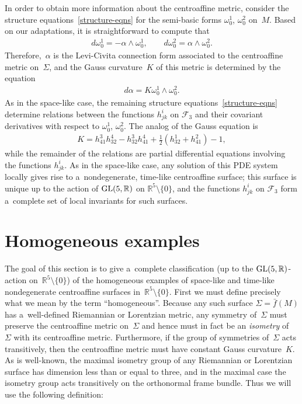 \documentclass[pdftex]{sigma}
\numberwithin{equation}{section}
\theoremstyle{definition}
\begin{document}
In order to obtain more information about the centroaf\/f\/ine metric, consider the structure
equations~\eqref{structure-eqns} for the semi-basic forms $\omega^1_0$, $\omega^2_0$ on~$M$.
Based on our adaptations, it is straightforward to compute that
\begin{gather*}
d\omega^1_0 = -\alpha \wedge \omega^1_0,
\qquad
d\omega^2_0 = \alpha \wedge \omega^2_0.
\end{gather*}
Therefore,~$\alpha$ is the Levi-Civita connection form associated to the centroaf\/f\/ine metric on~$\Sigma$, and the Gauss
curvature~$K$ of this metric is determined by the equation
\begin{gather*}
d\alpha = K  \omega^1_0 \wedge \omega^2_0.
\end{gather*}
As in the space-like case, the remaining structure equations~\eqref{structure-eqns} determine relations between the
functions $h^i_{jk}$ on $\mathcal{F}_3$ and their covariant derivatives with respect to $\omega^1_0$, $\omega^2_0$.
The analog of the Gauss equation is
\begin{gather}
K = h^3_{41} h^4_{32} - h^3_{32} h^4_{41} + \tfrac{1}{2}\left(h^1_{32} + h^2_{41} \right) - 1,
\label{time-like-Gauss-eqn}
\end{gather}
while the remainder of the relations are partial dif\/ferential equations involving the functions $h^i_{jk}$.
As in the space-like case, any solution of this PDE system locally gives rise to a~nondegenerate, time-like centroaf\/f\/ine
surface; this surface is unique up to the action of ${\rm GL}(5,\mathbb{R})$ on $\mathbb{R}^5 \setminus \{0 \}$, and the
functions $h^i_{jk}$ on $\mathcal{F}_3$ form a~complete set of local invariants for such surfaces.

\section{Homogeneous examples}\label{homog-sec}

The goal of this section is to give a~complete classif\/ication (up to the ${\rm GL}(5,\mathbb{R})$-action on~$\mathbb{R}^5 \setminus\{0\}$) of the homogeneous examples of space-like and time-like nondegenerate centroaf\/f\/ine surfaces
in~$\mathbb{R}^5 \setminus\{0\}$.
First we must def\/ine precisely what we mean by the term ``homogeneous''. Because any such surface $\Sigma = \bar{f}(M)$
has a~well-def\/ined Riemannian or Lorentzian metric, any symmetry of~$\Sigma$ must preserve the centroaf\/f\/ine metric
on~$\Sigma$ and hence must in fact be an {\em isometry} of~$\Sigma$ with its centroaf\/f\/ine metric.
Furthermore, if the group of symmetries of~$\Sigma$ acts transitively, then the centroaf\/f\/ine metric must have constant
Gauss curvature~$K$.
As is well-known, the maximal isometry group of any Riemannian or Lorentzian surface has dimension less than or equal to
three, and in the maximal case the isometry group acts transitively on the orthonormal frame bundle.
Thus we will use the following def\/inition:
\end{document}
